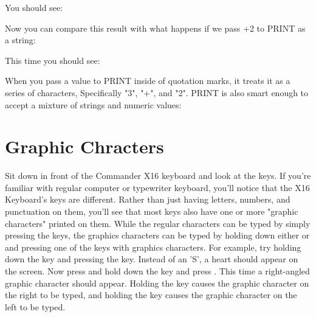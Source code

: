 You should see:\\


Now you can compare this result with what happens if we pass {+2} to
{\ttfamily PRINT} as a string:\\


This time you should see:\\


When you pass a value to {\ttfamily PRINT} inside of quotation marks, it treats
it as a series of characters, Specifically "3", "+", and "2".  {\ttfamily
PRINT} is also smart enough to accept a mixture of strings and numeric
values:\\



\chapter*{Graphic Chracters}

Sit down in front of the Commander X16 keyboard and look at the keys.  If
you're familiar with regular computer or typewriter keyboard, you'll notice
that the X16 Keyboard's keys are different.  Rather than just having letters,
numbers, and punctuation on them, you'll see that most keys also have one or
more "graphic characters" printed on them.  While the regular characters can be
typed by simply pressing the keys, the graphics characters can be typed by
holding down either \shiftkey or \altkey and pressing one of the keys with
graphics characters.  For example, try holding down the \shiftkey key and
pressing the  key.  Instead of an 'S', a heart
should appear on the screen.  Now press and hold down the \altkey key and press
.  This time a right-angled graphic character should appear.  Holding
the \shiftkey key causes the graphic character on the right to be typed, and
holding the \altkey key causes the graphic character on the left to be typed.\\

